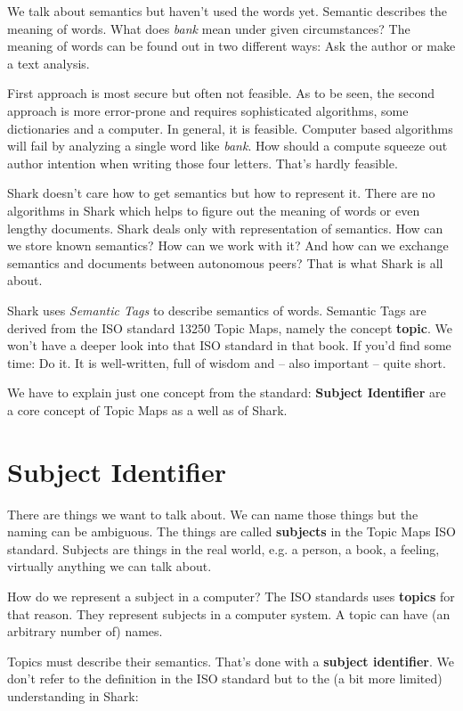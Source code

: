 We talk about semantics but haven't used the words yet. Semantic describes the meaning of words. What does {\it bank} mean under given circumstances? The meaning of words can be found out in two different ways: Ask the author or make a text analysis. 

First approach is most secure but often not feasible. As to be seen, the second approach is more error-prone and requires sophisticated algorithms, some dictionaries and a computer. In general, it is feasible. Computer based algorithms will fail by analyzing a single word like {\it bank}. How should a compute squeeze out author intention when writing those four letters. That's hardly feasible.

Shark doesn't care how to get semantics but how to represent it. There are no algorithms in Shark which helps to figure out the meaning of words or even lengthy documents. Shark deals only with representation of semantics. How can we store known semantics? How can we work with it? And how can we exchange semantics and documents between autonomous peers? That is what Shark is all about.

Shark uses {\it Semantic Tags} to describe semantics of words. Semantic Tags are derived from the ISO standard 13250 Topic Maps, namely the concept {\bf topic}. We won't have a deeper look into that ISO standard in that book. If you'd find some time: Do it. It is well-written, full of wisdom and -- also important -- quite short.

We have to explain just one concept from the standard: {\bf Subject Identifier} are a core concept of Topic Maps as a well as of Shark.

\section{Subject Identifier}
There are things we want to talk about. We can name those things but the naming can be ambiguous. The things are called {\bf subjects} in the Topic Maps ISO standard. Subjects are things in the real world, e.g. a person, a book, a feeling, virtually anything we can talk about.

How do we represent a subject in a computer? The ISO standards uses {\bf topics} for that reason. They represent subjects in a computer system. A topic can have (an arbitrary number of) names. 

Topics must describe their semantics. That's done with a {\bf subject identifier}. We don't refer to the definition in the ISO standard but to the (a bit more limited) understanding in Shark:


